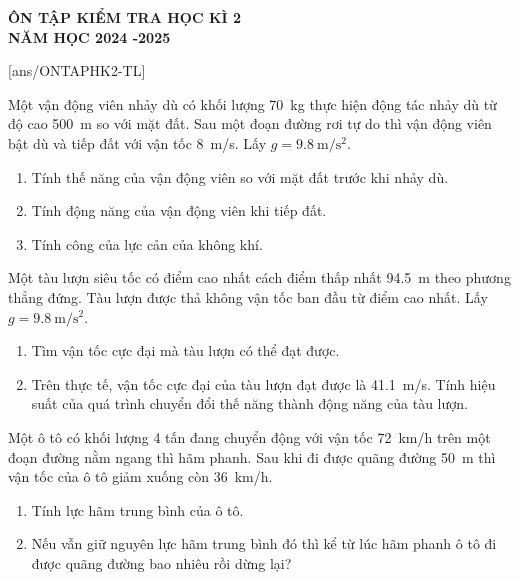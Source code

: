 \begin{center}
	\textbf{ÔN TẬP KIỂM TRA HỌC KÌ 2}\\
	\textbf{ NĂM HỌC 2024 -2025}
\end{center}
[ans/ONTAPHK2-TL]

\begin{ex}
	Một vận động viên nhảy dù có khối lượng \SI{70}{\kilogram} thực hiện động tác nhảy dù từ độ cao \SI{500}{\meter} so với mặt đất. Sau một đoạn đường rơi tự do thì vận động viên bật dù và tiếp đất với vận tốc \SI{8}{\meter/\second}. Lấy $g=\SI{9.8}{\meter/\second^2}$.
	\begin{enumerate}[label=\alph*)]
		\item Tính thế năng của vận động viên so với mặt đất trước khi nhảy dù.
		\item Tính động năng của vận động viên khi tiếp đất.
		\item Tính công của lực cản của không khí.
	\end{enumerate}
	\loigiai{
		
	}
\end{ex}
\begin{ex}
	Một tàu lượn siêu tốc có điểm cao nhất cách điểm thấp nhất \SI{94.5}{\meter} theo phương thẳng đứng. Tàu lượn được thả không vận tốc ban đầu từ điểm cao nhất. Lấy $g=\SI{9.8}{\meter/\second^2}$.
	\begin{enumerate}[label=\alph*)]
		\item Tìm vận tốc cực đại mà tàu lượn có thể đạt được.
		\item Trên thực tế, vận tốc cực đại của tàu lượn đạt được là \SI{41.1}{\meter/\second}. Tính hiệu suất của quá trình chuyển đổi thế năng thành động năng của tàu lượn.
	\end{enumerate}
	\loigiai{
		
	}
\end{ex}
\begin{ex}
	Một ô tô có khối lượng 4 tấn đang chuyển động với vận tốc \SI{72}{\kilo\meter/\hour} trên một đoạn đường nằm ngang thì hãm phanh. Sau khi đi được quãng đường \SI{50}{\meter} thì vận tốc của ô tô giảm xuống còn \SI{36}{\kilo\meter/\hour}.
	\begin{enumerate}[label=\alph*)]
		\item Tính lực hãm trung bình của ô tô.
		\item  Nếu vẫn giữ nguyên lực hãm trung bình đó thì kể từ lúc hãm phanh ô tô đi được quãng đường bao nhiêu rồi dừng lại?
	\end{enumerate}
	\loigiai{
		
	}
\end{ex}
